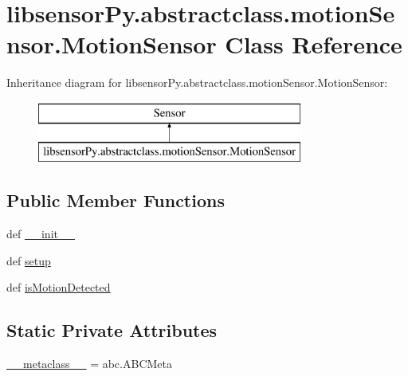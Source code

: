 \hypertarget{classlibsensorPy_1_1abstractclass_1_1motionSensor_1_1MotionSensor}{}\section{libsensor\+Py.\+abstractclass.\+motion\+Sensor.\+Motion\+Sensor Class Reference}
\label{classlibsensorPy_1_1abstractclass_1_1motionSensor_1_1MotionSensor}
Inheritance diagram for libsensor\+Py.\+abstractclass.\+motion\+Sensor.\+Motion\+Sensor\+:\begin{figure}[H]
\begin{center}
\leavevmode
\includegraphics[height=2.000000cm]{classlibsensorPy_1_1abstractclass_1_1motionSensor_1_1MotionSensor}
\end{center}
\end{figure}
\subsection*{Public Member Functions}
\begin{DoxyCompactItemize}
\item 
def \hyperlink{classlibsensorPy_1_1abstractclass_1_1motionSensor_1_1MotionSensor_a346d403dd96b9f32aecc98ef44248894}{\+\_\+\+\_\+init\+\_\+\+\_\+}
\item 
def \hyperlink{classlibsensorPy_1_1abstractclass_1_1motionSensor_1_1MotionSensor_a0e28a5adb26221412f57f40f3604fb10}{setup}
\item 
def \hyperlink{classlibsensorPy_1_1abstractclass_1_1motionSensor_1_1MotionSensor_a8772090b62cc714a84aeb56b3e0bccb9}{is\+Motion\+Detected}
\end{DoxyCompactItemize}
\subsection*{Static Private Attributes}
\begin{DoxyCompactItemize}
\item 
\hyperlink{classlibsensorPy_1_1abstractclass_1_1motionSensor_1_1MotionSensor_a0ace63dc4bf71a4fb56a83fd72a01449}{\+\_\+\+\_\+metaclass\+\_\+\+\_\+} = abc.\+A\+B\+C\+Meta
\end{DoxyCompactItemize}


